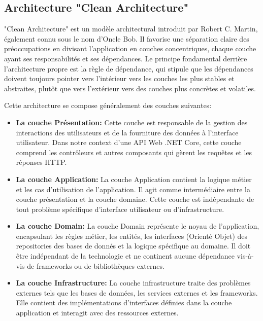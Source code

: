 \subsection{Architecture "Clean Architecture"}
\noindent
"Clean Architecture" est un modèle architectural introduit par Robert C. Martin, également connu sous le nom d'Oncle Bob. Il favorise une séparation claire des préoccupations en divisant l'application en couches concentriques, chaque couche ayant ses responsabilités et ses dépendances. Le principe fondamental derrière l'architecture propre est la règle de dépendance, qui stipule que les dépendances doivent toujours pointer vers l'intérieur vers les couches les plus stables et abstraites, plutôt que vers l'extérieur vers des couches plus concrètes et volatiles. 

\noindent
Cette architecture se compose généralement des couches suivantes: \\

\begin{itemize}
    \small\item \textbf{La couche Présentation: } Cette couche est responsable de la gestion des interactions des utilisateurs et de la fourniture des données à l'interface utilisateur. Dans notre context d'une API Web .NET Core, cette couche comprend les contrôleurs et autres composants qui gèrent les requêtes et les réponses HTTP.

    \small\item \textbf{La couche Application: } La couche Application contient la logique métier et les cas d’utilisation de l’application. Il agit comme intermédiaire entre la couche présentation et la couche domaine. Cette couche est indépendante de tout problème spécifique d’interface utilisateur ou d’infrastructure.
    \small\item \textbf{La couche Domain: } La couche Domain représente le noyau de l’application, encapsulant les règles métier, les entités, les interfaces (Orienté Objet) des repositories des bases de donnés et la logique spécifique au domaine. Il doit être indépendant de la technologie et ne continent aucune dépendance vis-à-vis de frameworks ou de bibliothèques externes.

    \small\item \textbf{La couche Infrastructure: } La couche infrastructure traite des problèmes externes tels que les bases de données, les services externes et les frameworks. Elle contient des implémentations d'interfaces définies dans la couche application et interagit avec des ressources externes.
\end{itemize}

